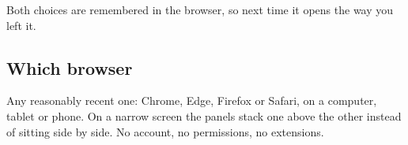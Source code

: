 Both choices are remembered in the browser, so next time it opens the way you
left it.

\subsection{Which browser}

Any reasonably recent one: Chrome, Edge, Firefox or Safari, on a computer,
tablet or phone. On a narrow screen the panels stack one above the other
instead of sitting side by side. No account, no permissions, no extensions.
